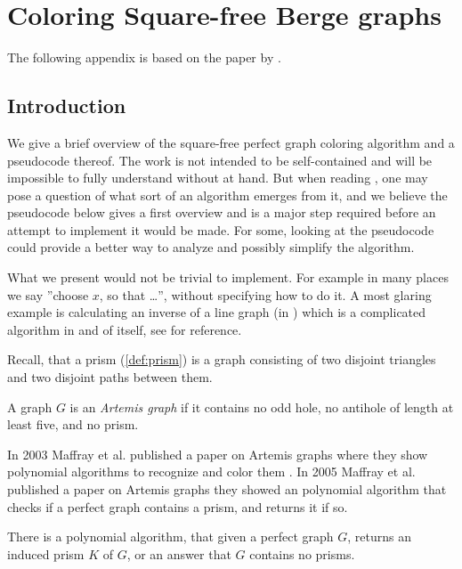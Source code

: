 \chapter{Coloring Square-free Berge graphs}
\label{ch:coloringSquareFree}

The following appendix is based on the paper  by \citeauthor{coloringSquareFree} \cite{coloringSquareFree}.

\section{Introduction}
We give a brief overview of the square-free perfect graph coloring algorithm and a pseudocode thereof. The work is not intended to be self-contained and will be impossible to fully understand without \cite{coloringSquareFree} at hand. But when reading \cite{coloringSquareFree}, one may pose a question of what sort of an algorithm emerges from it, and we believe the pseudocode below gives a first overview and is a major step required before an attempt to implement it would be made. For some, looking at the pseudocode could provide a better way to analyze and possibly simplify the algorithm.

What we present would not be trivial to implement. For example in many places we say ''choose $x$, so that \dots'', without specifying how to do it. A most glaring example is calculating an inverse of a line graph (in ) which is a complicated algorithm in and of itself, see \cite{Liu2014} for reference.

Recall, that a prism (\cref{def:prism}) is a graph consisting of two disjoint triangles and two disjoint paths between them.

\begin{defnTwo}
  A graph $G$ is an \emph{Artemis graph} if it contains no odd hole, no antihole of length at least five, and no prism.
\end{defnTwo}

In 2003 Maffray et al. published a paper on Artemis graphs where they show polynomial algorithms to recognize and color them \cite{Maffray2006}. In 2005 Maffray et al. published a paper on Artemis graphs \cite{Maffray2005} they showed an polynomial algorithm that checks if a perfect graph contains a prism, and returns it if so.

\begin{theorem}{\cite{Maffray2005}}
  \label{thm:getPrism}
  There is a polynomial algorithm, that given a perfect graph $G$, returns an induced prism $K$ of $G$, or an answer that $G$ contains no prisms.
\end{theorem}


